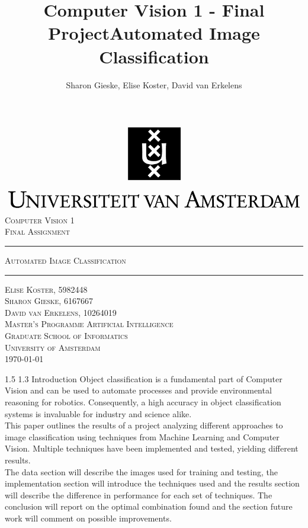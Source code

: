 \documentclass[12pt,a4paper]{amsart}
\title{Computer Vision 1 - Final Project}
\author{
Sharon Gieske, Elise Koster, David van Erkelens
}
\title{Automated Image Classification}
\date{}
\makeatletter
\def\section{%
  \@startsection{section}{1}{\z@}%
  {1.5\linespacing\@plus\linespacing}%
  {1.3\linespacing}%
  {\bfseries\normalfont\scshape}
}
\makeatother
\begin{document}
\begin{titlepage}
\begin{center}
    \includegraphics[width=\textwidth]{logo.png}
    \\ [2.5cm]
    \textsc{\Large Computer Vision 1}
    \\ [0.5cm]
    \textsc{\large Final Assignment}
    \\ [1cm]
    \hrule
    \vspace{0.3cm}
    \textsc{Automated Image Classification}
    \\ [0.3cm]
    \hrule
    \vfill
    \textsc{Elise Koster, 5982448 \\ Sharon Gieske, 6167667 \\ David van Erkelens, 10264019 \\[0.7cm] Master's Programme Artificial Intelligence \\Graduate School of Informatics \\ University of Amsterdam \\[0.4cm] \today}
\end{center}
\end{titlepage}

\section{Introduction}
Object classification is a fundamental part of Computer Vision and can be used to automate processes and provide environmental reasoning for robotics. Consequently, a high accuracy in object classification systems is invaluable for industry and science alike.\\
This paper outlines the results of a project analyzing different approaches to image classification using techniques from Machine Learning and Computer Vision. Multiple techniques have been implemented and tested, yielding different results.\\
The data section will describe the images used for training and testing, the implementation section will introduce the techniques used and the results section will describe the difference in performance for each set of techniques. The conclusion will report on the optimal combination found and the section future work will comment on possible improvements.
\end{document}
